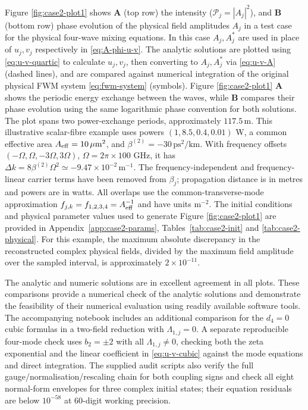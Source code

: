 \documentclass[11pt,a4paper]{article}
\numberwithin{equation}{section}
\begin{document}
Figure \ref{fig:case2-plot1} shows \textbf{A} (top row) the intensity ($\mathcal{P}_j=\left|A_j\right|^2$), and \textbf{B} (bottom row) phase evolution of the physical field amplitudes $A_j$ in a test case for the physical four-wave mixing equations.
In this case $A_j, A^*_j$ are used in place of $u_j, v_j$ respectively in \eqref{eq:A-phi-u-v}.
The analytic solutions are plotted using \eqref{eq:u-v-quartic} to calculate $u_j, v_j$, then converting to $A_j, A_j^{*}$ via \eqref{eq:u-v-A} (dashed lines), and are compared against numerical integration of the original physical FWM system \eqref{eq:fwm-system} (symbols).
Figure \ref{fig:case2-plot1} \textbf{A} shows the periodic energy exchange between the waves, while \textbf{B} compares their phase evolution using the same logarithmic phase convention for both solutions.
The plot spans two power-exchange periods, approximately $117.5\,\mathrm m$.
This illustrative scalar-fibre example uses powers $(1,8.5,0.4,0.01)$ W, a common effective area $A_{\rm eff}=10\,\mu\mathrm m^2$, and $\beta^{(2)}=-30\,\mathrm{ps}^2/\mathrm{km}$.
With frequency offsets $(-\Omega,\Omega,-3\Omega,3\Omega)$, $\Omega=2\pi\times100$ GHz, it has $\Delta k=8\beta^{(2)}\Omega^2\simeq-9.47\times10^{-2}\,\mathrm m^{-1}$.
The frequency-independent and frequency-linear carrier terms have been removed from $\beta_j$; propagation distance is in metres and powers are in watts.
All overlaps use the common-transverse-mode approximation $f_{j,k}=f_{1,2,3,4}=A_{\rm eff}^{-1}$ and have units $\mathrm m^{-2}$.
The initial conditions and physical parameter values used to generate Figure \ref{fig:case2-plot1} are provided in Appendix~\ref{app:case2-params}, Tables~\ref{tab:case2-init} and \ref{tab:case2-physical}.
For this example, the maximum absolute discrepancy in the reconstructed complex physical fields, divided by the maximum field amplitude over the sampled interval, is approximately $2\times10^{-11}$.

The analytic and numeric solutions are in excellent agreement in all plots.
These comparisons provide a numerical check of the analytic solutions and demonstrate the feasibility of their numerical evaluation using readily available software tools.
The accompanying notebook includes an additional comparison for the $d_4=0$ cubic formulas in a two-field reduction with $\Lambda_{1,j}=0$.
A separate reproducible four-mode check uses $b_2=\pm2$ with all $\Lambda_{1,j}\ne0$, checking both the zeta exponential and the linear coefficient in \eqref{eq:u-v-cubic} against the mode equations and direct integration.
The supplied audit scripts also verify the full gauge/normalisation/rescaling chain for both coupling signs and check all eight normal-form envelopes for three complex initial states; their equation residuals are below $10^{-58}$ at 60-digit working precision.
\end{document}
